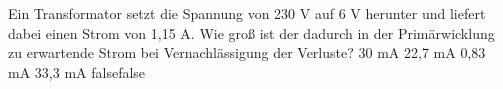     {Ein Transformator setzt die Spannung von 230 V auf 6 V herunter und liefert dabei einen Strom von 1,15 A. Wie groß ist der dadurch in der Primärwicklung zu erwartende Strom bei Vernachlässigung der Verluste?}
    {30 mA}
    {22,7 mA}
    {0,83 mA}
    {33,3 mA}
    {false}{false}